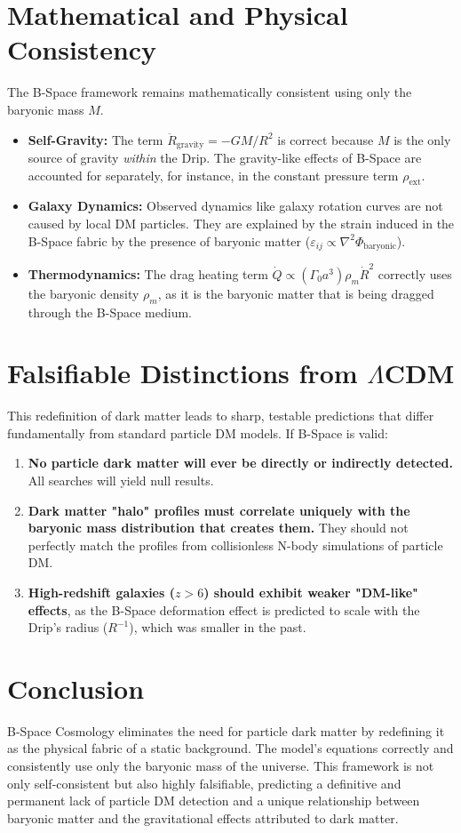 \documentclass{BSpacePaper} %
\begin{document}
\section{Mathematical and Physical Consistency}
The B-Space framework remains mathematically consistent using only the baryonic mass $M$.
\begin{itemize}
    \item \textbf{Self-Gravity:} The term $\ddot{R}_{\text{gravity}}=-GM/R^2$ is correct because $M$ is the only source of gravity \textit{within} the Drip. The gravity-like effects of B-Space are accounted for separately, for instance, in the constant pressure term $\rho_{\text{ext}}$.
    \item \textbf{Galaxy Dynamics:} Observed dynamics like galaxy rotation curves are not caused by local DM particles. They are explained by the strain induced in the B-Space fabric by the presence of baryonic matter ($\varepsilon_{ij} \propto \nabla^2\Phi_{\text{baryonic}}$).
    \item \textbf{Thermodynamics:} The drag heating term $\dot{Q} \propto (\Gamma_0 a^3) \rho_m \dot{R}^2$ correctly uses the baryonic density $\rho_m$, as it is the baryonic matter that is being dragged through the B-Space medium.
\end{itemize}

\section{Falsifiable Distinctions from \(\Lambda\)CDM}
This redefinition of dark matter leads to sharp, testable predictions that differ fundamentally from standard particle DM models. If B-Space is valid:
\begin{enumerate}
    \item \textbf{No particle dark matter will ever be directly or indirectly detected.} All searches will yield null results.
    \item \textbf{Dark matter "halo" profiles must correlate uniquely with the baryonic mass distribution that creates them.} They should not perfectly match the profiles from collisionless N-body simulations of particle DM.
    \item \textbf{High-redshift galaxies ($z>6$) should exhibit weaker "DM-like" effects}, as the B-Space deformation effect is predicted to scale with the Drip's radius ($R^{-1}$), which was smaller in the past.
\end{enumerate}

\section{Conclusion}
B-Space Cosmology eliminates the need for particle dark matter by redefining it as the physical fabric of a static background. The model's equations correctly and consistently use only the baryonic mass of the universe. This framework is not only self-consistent but also highly falsifiable, predicting a definitive and permanent lack of particle DM detection and a unique relationship between baryonic matter and the gravitational effects attributed to dark matter.
\end{document}
